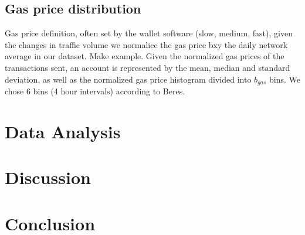 \documentclass[12pt,a4paper,titlepage,oneside,english]{article}
\begin{document}
\subsection{Gas price distribution}
Gas price definition, often set by the wallet software (slow, medium, fast), given the changes in traffic volume we normalice the gas price bxy the daily network average in our dataset. Make example. Given the normalized gas prices of the transactions sent, an account is represented by the mean, median and standard deviation, as well as the normalized gas price histogram divided into $b_{gas}$ bins. We chose 6 bins (4 hour intervals) according to Beres.




\section{Data Analysis}





\section{Discussion}




\section{Conclusion}




\newpage
\setcounter{page}{1}
\onehalfspacing
{}



\end{document}
